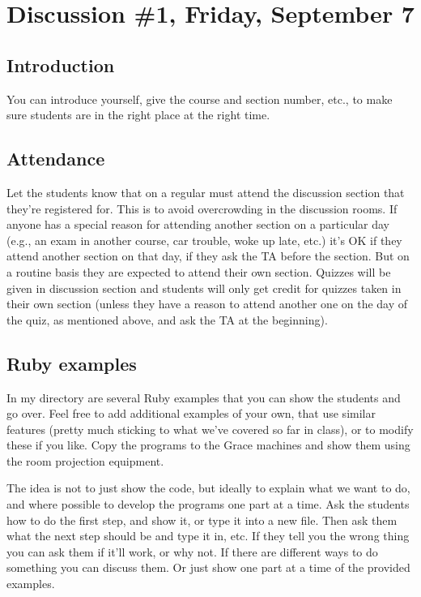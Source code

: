 \documentclass[12pt]{article}
\begin{document}

  \section{Discussion \#1, Friday, September 7}

    \subsection{Introduction}

      You can introduce yourself, give the course and section number, etc.,
    to make sure students are in the right place at the right time.

    \subsection{Attendance}

      Let the students know that on a regular must attend the discussion
    section that they're registered for.  This is to avoid overcrowding in
    the discussion rooms.  If anyone has a special reason for attending
    another section on a particular day (e.g., an exam in another course,
    car trouble, woke up late, etc.) it's OK if they attend another section
    on that day, if they ask the TA before the section.  But on a routine
    basis they are expected to attend their own section.  Quizzes will be
    given in discussion section and students will only get credit for
    quizzes taken in their own section (unless they have a reason to attend
    another one on the day of the quiz, as mentioned above, and ask the TA
    at the beginning).

    \subsection{Ruby examples}

      In my directory are several Ruby examples that you can show the students
    and go over.  Feel free to add additional examples of your own, that use
    similar features (pretty much sticking to what we've covered so far in
    class), or to modify these if you like.  Copy the programs to the Grace
    machines and show them using the room projection equipment.

      The idea is not to just show the code, but ideally to explain what we
    want to do, and where possible to develop the programs one part at a
    time.  Ask the students how to do the first step, and show it, or type
    it into a new file.  Then ask them what the next step should be and type
    it in, etc.  If they tell you the wrong thing you can ask them if it'll
    work, or why not.  If there are different ways to do something you can
    discuss them.  Or just show one part at a time of the provided examples.
\end{document}
